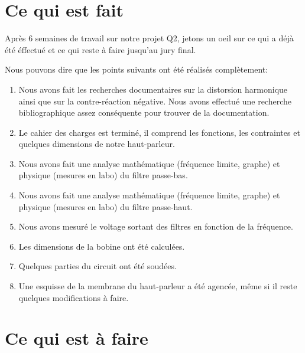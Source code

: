 

\section{Ce qui est fait}
Après 6 semaines de travail sur notre projet Q2, jetons un oeil sur ce qui a déjà été éffectué et ce qui reste à faire jusqu'au jury final.

Nous pouvons dire que les points suivants ont été réalisés complètement:
\\
\begin{enumerate}
\item Nous avons fait les recherches documentaires sur la distorsion harmonique ainsi que sur la contre-réaction négative.
Nous avons effectué une recherche bibliographique assez conséquente pour trouver de la documentation.
\item Le cahier des charges est terminé, il comprend les fonctions, les contraintes et quelques dimensions de notre haut-parleur.
\item Nous avons fait une analyse mathématique (fréquence limite, graphe) et physique (mesures en labo) du filtre passe-bas. 
\item Nous avons fait une analyse mathématique (fréquence limite, graphe) et physique (mesures en labo) du filtre passe-haut.
\item Nous avons mesuré le voltage sortant des filtres en fonction de la fréquence.
\item Les dimensions de la bobine ont été calculées.
\item Quelques parties du circuit ont été soudées.
\item Une esquisse de la membrane du haut-parleur a été agencée, même si il reste quelques modifications à faire.
\end{enumerate}

\section{Ce qui est à faire}

